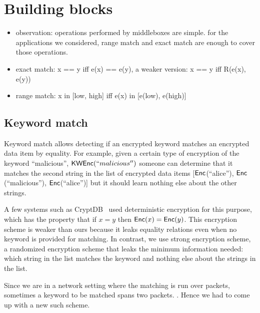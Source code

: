 
\section{Building blocks}\label{sec:blocks}


\begin{itemize}
\item observation: operations performed by middleboxes are simple. for the applications we considered, range match and exact match are enough to cover those operations.
\item exact match: x == y iff e(x) == e(y), a weaker version: x == y iff R(e(x), e(y))
\item range match: x in [low, high] iff e(x) in [e(low), e(high)]

\end{itemize}


\subsection{Keyword match}


%

Keyword match allows detecting if an encrypted keyword matches an encrypted data item by equality.
For example, given a certain type of encryption of the keyword ``malicious'', $\mathsf{KWEnc}(``malicious'')$ someone can determine that it matches the second string in the list of encrypted data items [$\mathsf{Enc}$(``alice''), $\mathsf{Enc}$(``malicious''), $\mathsf{Enc}$(``alice'')] but it should learn nothing else about the other strings.

A few systems such as CryptDB~\cite{cryptdb, some other} used deterministic encryption for this purpose, which has the property that if $x = y$ then $\mathsf{Enc}(x) = \mathsf{Enc}(y)$. This encryption scheme is weaker than ours because it leaks equality relations even when no keyword is provided for matching. In contrast, we use strong encryption scheme, a randomized encryption scheme that leaks the minimum information needed: which string in the list matches the keyword and nothing else about the strings in the list. 

Since we are in a network setting where the matching is run over packets, sometimes a keyword to be matched spans two packets. . Hence we had to come up with a new such scheme. 

